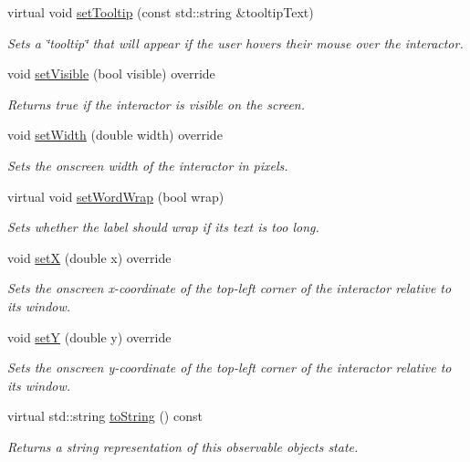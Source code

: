 \begin{DoxyCompactItemize}
virtual void \mbox{\hyperlink{classsgl_1_1GInteractor_a039e0e49beaecc275efce02d416acea8}{set\+Tooltip}} (const std\+::string \&tooltip\+Text)
\begin{DoxyCompactList}\small\item\em Sets a \char`\"{}tooltip\char`\"{} that will appear if the user hovers their mouse over the interactor. \end{DoxyCompactList}\item 
void \mbox{\hyperlink{classsgl_1_1GLabel_afcc2a51afef8e2e61d8d9191386fb93f}{set\+Visible}} (bool visible) override
\begin{DoxyCompactList}\small\item\em Returns true if the interactor is visible on the screen. \end{DoxyCompactList}\item 
void \mbox{\hyperlink{classsgl_1_1GLabel_af0c5b6fb4e3c3c9a3fabde548efa93db}{set\+Width}} (double width) override
\begin{DoxyCompactList}\small\item\em Sets the onscreen width of the interactor in pixels. \end{DoxyCompactList}\item 
virtual void \mbox{\hyperlink{classsgl_1_1GLabel_a8e935ba463ac070ea906118661b15a5f}{set\+Word\+Wrap}} (bool wrap)
\begin{DoxyCompactList}\small\item\em Sets whether the label should wrap if its text is too long. \end{DoxyCompactList}\item 
void \mbox{\hyperlink{classsgl_1_1GLabel_a173837ba805eaa2411e88834869d3a9c}{setX}} (double x) override
\begin{DoxyCompactList}\small\item\em Sets the onscreen x-\/coordinate of the top-\/left corner of the interactor relative to its window. \end{DoxyCompactList}\item 
void \mbox{\hyperlink{classsgl_1_1GLabel_a0b738606c7aca5c472b66c4e55b3c685}{setY}} (double y) override
\begin{DoxyCompactList}\small\item\em Sets the onscreen y-\/coordinate of the top-\/left corner of the interactor relative to its window. \end{DoxyCompactList}\item 
virtual std\+::string \mbox{\hyperlink{classsgl_1_1GObservable_a1fe5121d6528fdea3f243321b3fa3a49}{to\+String}} () const
\begin{DoxyCompactList}\small\item\em Returns a string representation of this observable object\textquotesingle{}s state. \end{DoxyCompactList}\end{DoxyCompactItemize}
